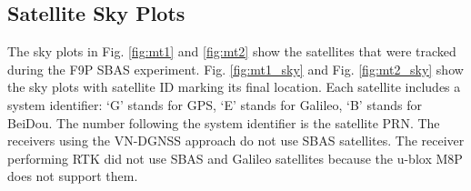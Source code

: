 \documentclass[letterpaper, 10 pt,onecolumn]{article}
\begin{document}
	
	
	
	
	\subsection{Satellite Sky Plots}
	
	The sky plots in Fig. \ref{fig:mt1} and \ref{fig:mt2} show the satellites that were tracked during the F9P SBAS experiment. 
	Fig. \ref{fig:mt1_sky} and Fig. \ref{fig:mt2_sky} show the sky plots with satellite ID marking its final location. 
	Each satellite includes a system  identifier: 
	`G' stands for GPS, 
	`E' stands for Galileo, 
	`B' stands for BeiDou. \blue 
	The number following the system identifier is the satellite PRN. \black
	\red 
	The receivers using the VN-DGNSS approach do not use SBAS satellites. 
	The receiver performing RTK did not use SBAS and Galileo satellites because the u-blox M8P does not support them.
	\black
	
\end{document}
